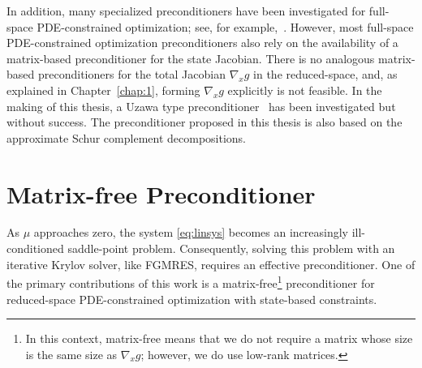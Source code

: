 In addition, many specialized preconditioners have been investigated for full-space PDE-constrained optimization; see, for example,~\cite{Rees2010optimal}.
However, most full-space PDE-constrained optimization preconditioners also rely on
the availability of a matrix-based preconditioner for the state Jacobian. There
is no analogous matrix-based preconditioners for the total Jacobian $\nabla_x g$
in the reduced-space, and, as explained in Chapter~\ref{chap:1}, forming $\nabla_x
g$ explicitly is not feasible. In the making of this thesis, a Uzawa type 
preconditioner~\cite{Hu_uzawa} has been investigated but without success. 
The preconditioner proposed in this thesis is also based on the approximate Schur complement decompositions. 



\section{Matrix-free Preconditioner}\label{sec:matfreepc}
As $\mu$ approaches zero, the system \eqref{eq:linsys} becomes an increasingly
ill-conditioned saddle-point problem.  Consequently, solving this problem with
an iterative Krylov solver, like FGMRES, requires an effective preconditioner.  
 One of the primary contributions of
this work is a matrix-free\footnote{In this context, matrix-free means that we
  do not require a matrix whose size is the same size as $\nabla_x g$; however,
  we do use low-rank matrices.} preconditioner for reduced-space PDE-constrained
optimization with state-based constraints.


